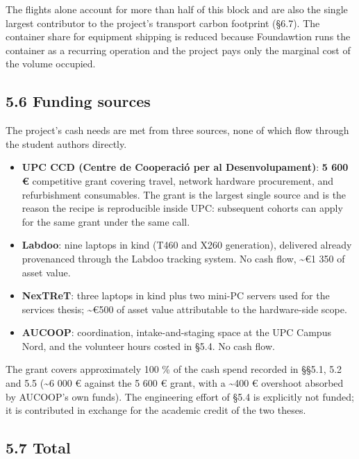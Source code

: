 The flights alone account for more than half of this block and are also
the single largest contributor to the project's transport carbon
footprint (§6.7). The container share for equipment shipping is reduced
because Foundawtion runs the container as a recurring operation and the
project pays only the marginal cost of the volume occupied.

\hypertarget{funding-sources}{%
\subsection{5.6 Funding sources}\label{funding-sources}}

The project's cash needs are met from three sources, none of which flow
through the student authors directly.

\begin{itemize}
\tightlist
\item
  \textbf{UPC CCD (Centre de Cooperació per al Desenvolupament)}:
  \textbf{5 600 €} competitive grant covering travel, network hardware
  procurement, and refurbishment consumables. The grant is the largest
  single source and is the reason the recipe is reproducible inside UPC:
  subsequent cohorts can apply for the same grant under the same call.
\item
  \textbf{Labdoo}: nine laptops in kind (T460 and X260 generation),
  delivered already provenanced through the Labdoo tracking system. No
  cash flow, \textasciitilde€1 350 of asset value.
\item
  \textbf{NexTReT}: three laptops in kind plus two mini-PC servers used
  for the services thesis; \textasciitilde€500 of asset value
  attributable to the hardware-side scope.
\item
  \textbf{AUCOOP}: coordination, intake-and-staging space at the UPC
  Campus Nord, and the volunteer hours costed in §5.4. No cash flow.
\end{itemize}

The grant covers approximately 100 \% of the cash spend recorded in
§§5.1, 5.2 and 5.5 (\textasciitilde6 000 € against the 5 600 € grant,
with a \textasciitilde400 € overshoot absorbed by AUCOOP's own funds).
The engineering effort of §5.4 is explicitly not funded; it is
contributed in exchange for the academic credit of the two theses.

\hypertarget{total}{%
\subsection{5.7 Total}\label{total}}

